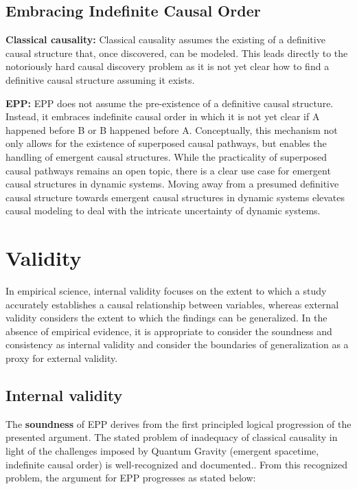 \documentclass{article}
\begin{document}
\subsection{Embracing Indefinite Causal Order}

\textbf{Classical causality:} 
Classical causality assumes the existing of a definitive causal structure that, once discovered, can be modeled. This leads directly to the notoriously hard causal discovery problem as it is not yet clear how to find a definitive causal structure assuming it exists.

\textbf{EPP:} 
EPP does not assume the pre-existence of a definitive causal structure. Instead, it embraces indefinite causal order in which it is not yet clear if A happened before B or B happened before A. Conceptually, this mechanism not only allows for the existence of superposed causal pathways, but enables the handling of emergent causal structures. While the practicality of superposed causal pathways remains an open topic, there is a clear use case for emergent causal structures in dynamic systems. Moving away from a presumed definitive causal structure towards emergent causal structures in dynamic systems elevates causal modeling to deal with the intricate uncertainty of dynamic systems.

\section{Validity}
\label{sec:validity}

In empirical science, internal validity focuses on the extent to which a study accurately establishes a causal relationship between variables, whereas external validity considers the extent to which the findings can be generalized.
In the absence of empirical evidence, it is appropriate to consider the soundness and consistency as internal validity and consider the boundaries of generalization as a proxy for external validity.

\subsection{Internal validity}
\label{sec:validity_internal}

The \textbf{soundness} of EPP derives from the first principled logical progression of the presented argument. The stated problem of inadequacy of classical causality in light of the challenges imposed by Quantum Gravity (emergent spacetime, indefinite causal order) is well-recognized and documented\cite{MriniHardyIndefinite}.. From this recognized problem, the argument for EPP progresses as stated below:
\end{document}
